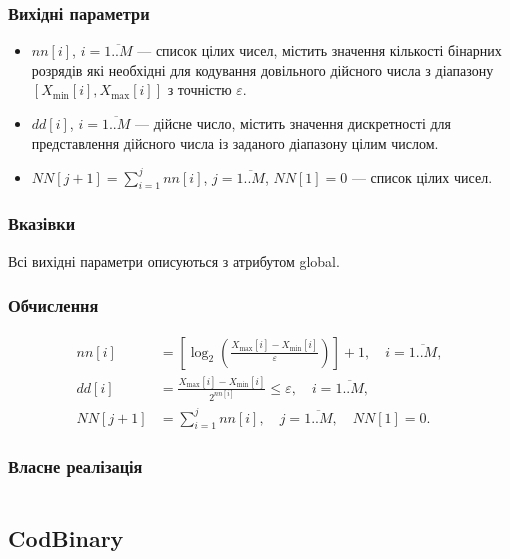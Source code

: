 \documentclass[a4paper, 12pt]{article}
\numberwithin{equation}{section}
\begin{document}
\subsubsection*{Вихідні параметри}

\begin{itemize}
    \item $nn[i]$, $i = \overline{1..M}$ --- список цілих чисел, містить значення кількості бінарних розрядів які необхідні для кодування довільного дійсного числа з діапазону $[X_{\text{min}}[i], X_{\text{max}}[i]]$ з точністю $\varepsilon$.
    \item $dd[i]$, $i = \overline{1..M}$ --- дійсне число, містить значення дискретності для представлення дійсного числа із заданого діапазону цілим числом.
    \item $NN[j + 1] = \sum_{i = 1}^j nn[i]$, $j = \overline{1..M}$, $NN[1] = 0$ --- список цілих чисел.
\end{itemize}

\subsubsection*{Вказівки}

Всі вихідні параметри описуються з атрибутом global.

\subsubsection*{Обчислення}

\begin{align}
    nn[i] &= \left[ \log_2 \left( \frac{X_{\text{max}}[i] - X_{\text{min}}[i]}{\varepsilon} \right) \right] + 1, \quad i = \overline{1..M}, \\
    dd[i] &= \frac{X_{\text{max}}[i] - X_{\text{min}}[i]}{2^{nn[i]}} \le \varepsilon, \quad i = \overline{1..M}, \\
    NN[j + 1] &= \sum_{i = 1}^j nn[i], \quad j = \overline{1..M}, \quad NN[1] = 0.
\end{align}

\subsubsection*{Власне реалізація}

\inputminted[firstline=9, lastline=51]{python}{../code/bin_dec_param.py}

\subsection{CodBinary}
\end{document}
